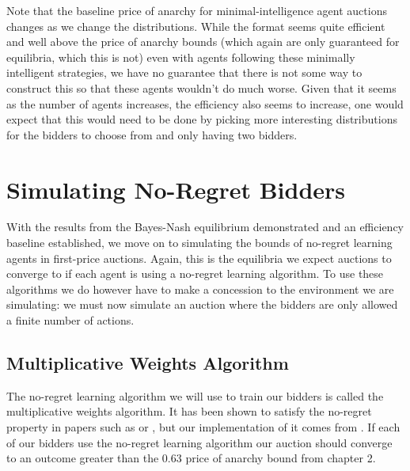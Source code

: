 \documentclass[12pt,twoside]{reedthesis}
\begin{document}
Note that the baseline price of anarchy for minimal-intelligence agent auctions changes as we change the distributions. While the format seems quite efficient and well above the price of anarchy bounds (which again are only guaranteed for equilibria, which this is not) even with agents following these minimally intelligent strategies, we have no guarantee that there is not some way to construct this so that these agents wouldn't do much worse. Given that it seems as the number of agents increases, the efficiency also seems to increase, one would expect that this would need to be done by picking more interesting distributions for the bidders to choose from and only having two bidders.

\section{Simulating No-Regret Bidders}
With the results from the Bayes-Nash equilibrium demonstrated and an efficiency baseline established, we move on to simulating the bounds of no-regret learning agents in first-price auctions. Again, this is the equilibria we expect auctions to converge to if each agent is using a no-regret learning algorithm. To use these algorithms we do however have to make a concession to the environment we are simulating: we must now simulate an auction where the bidders are only allowed a finite number of actions.

\subsection{Multiplicative Weights Algorithm}
The no-regret learning algorithm we will use to train our bidders is called the multiplicative weights algorithm. It has been shown to satisfy the no-regret property in papers such as \citet{Littlestone1994} or \citet{Freund1999}, but our implementation of it comes from \cite{Roughgarden2016}. If each of our bidders use the no-regret learning algorithm our auction should converge to an outcome greater than the $0.63$ price of anarchy bound from chapter 2. 
\end{document}
